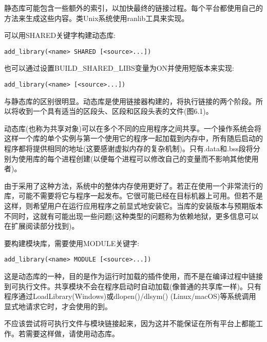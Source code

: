 静态库可能包含一些额外的索引，以加快最终的链接过程。每个平台都使用自己的方法来生成这些内容。类Unix系统使用ranlib工具来实现。


可以用SHARED关键字构建动态库:

\begin{lstlisting}[style=styleCMake]
add_library(<name> SHARED [<source>...])
\end{lstlisting}

也可以通过设置BUILD\_SHARED\_LIBS变量为ON并使用短版本来实现:

\begin{lstlisting}[style=styleCMake]
add_library(<name> [<source>...])
\end{lstlisting}

与静态库的区别很明显。动态库是使用链接器构建的，将执行链接的两个阶段。所以将收到一个具有适当的区段头、区段和区段头表的文件(图6.1)。

动态库(也称为共享对象)可以在多个不同的应用程序之间共享。一个操作系统会将这样一个库的单个实例与第一个使用它的程序一起加载到内存中，所有随后启动的程序都将提供相同的地址(这要感谢虚拟内存的复杂机制)。只有.data和.bss段将分别为使用库的每个进程创建(以便每个进程可以修改自己的变量而不影响其他使用者)。

由于采用了这种方法，系统中的整体内存使用更好了。若正在使用一个非常流行的库，可能不需要将它与程序一起发布。它很可能已经在目标机器上可用。但若不是这样，则希望用户在运行应用程序之前显式地安装它。当库的安装版本与预期版本不同时，这就有可能出现一些问题(这种类型的问题称为依赖地狱，更多信息可以在扩展阅读部分找到)。


要构建模块库，需要使用MODULE关键字:

\begin{lstlisting}[style=styleCMake]
add_library(<name> MODULE [<source>...])
\end{lstlisting}

这是动态库的一种，目的是作为运行时加载的插件使用，而不是在编译过程中链接到可执行文件。共享模块不会在程序启动时自动加载(像普通的共享库一样)。只有程序通过LoadLibrary(Windows)或dlopen()/dlsym() (Linux/macOS)等系统调用显式地请求它时，才会使用的到。

不应该尝试将可执行文件与模块链接起来，因为这并不能保证在所有平台上都能工作。若需要这样做，请使用动态库。


